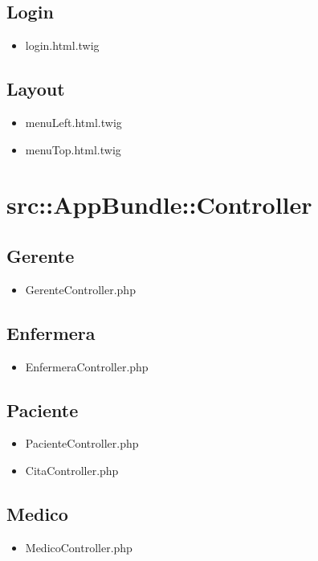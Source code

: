 		\subsection{Login}
		\begin{itemize}
			\item login.html.twig
		\end{itemize}
		\subsection{Layout}
		\begin{itemize}
			\item menuLeft.html.twig
			\item menuTop.html.twig
		\end{itemize}
		
		
		
		
	\section{src::AppBundle::Controller}
	\subsection{Gerente}
	\begin{itemize}
		\item GerenteController.php
	\end{itemize}
	\subsection{Enfermera}
	\begin{itemize}
		\item EnfermeraController.php
	\end{itemize}
	\subsection{Paciente}
	\begin{itemize}
		\item PacienteController.php
		\item CitaController.php
	\end{itemize}
	\subsection{Medico}
	\begin{itemize}
		\item MedicoController.php
	\end{itemize}
